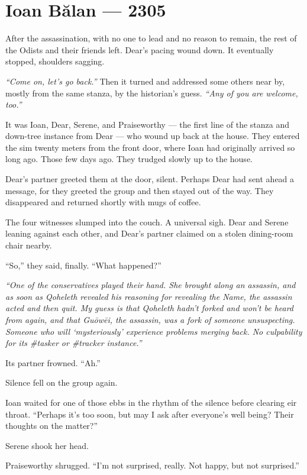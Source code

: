 \hypertarget{ioan-bux103lan-2305}{%
\chapter*{Ioan Bălan — 2305}\label{ioan-bux103lan-2305}}

After the assassination, with no one to lead and no reason to remain, the rest of the Odists and their friends left. Dear's pacing wound down. It eventually stopped, shoulders sagging.

\emph{``Come on, let's go back.''} Then it turned and addressed some others near by, mostly from the same stanza, by the historian's guess. \emph{``Any of you are welcome, too.''}

It was Ioan, Dear, Serene, and Praiseworthy — the first line of the stanza and down-tree instance from Dear — who wound up back at the house. They entered the sim twenty meters from the front door, where Ioan had originally arrived so long ago. Those few days ago. They trudged slowly up to the house.

Dear's partner greeted them at the door, silent. Perhaps Dear had sent ahead a message, for they greeted the group and then stayed out of the way. They disappeared and returned shortly with mugs of coffee.

The four witnesses slumped into the couch. A universal sigh. Dear and Serene leaning against each other, and Dear's partner claimed on a stolen dining-room chair nearby.

``So,'' they said, finally. ``What happened?''

\emph{``One of the conservatives played their hand. She brought along an assassin, and as soon as Qoheleth revealed his reasoning for revealing the Name, the assassin acted and then quit. My guess is that Qoheleth hadn't forked and won't be heard from again, and that Guōwēi, the assassin, was a fork of someone unsuspecting. Someone who will `mysteriously' experience problems merging back. No culpability for its \#tasker or \#tracker instance.''}

Its partner frowned. ``Ah.''

Silence fell on the group again.

Ioan waited for one of those ebbs in the rhythm of the silence before clearing eir throat. ``Perhaps it's too soon, but may I ask after everyone's well being? Their thoughts on the matter?''

Serene shook her head.

Praiseworthy shrugged. ``I'm not surprised, really. Not happy, but not surprised.''

